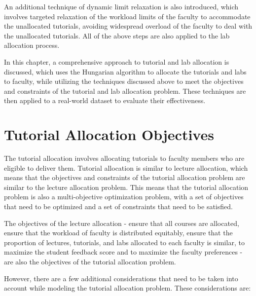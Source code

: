 An additional technique of dynamic limit relaxation is also introduced, which involves targeted relaxation of the workload limits of the faculty to accommodate the unallocated tutorials, avoiding widespread overload of the faculty to deal with the unallocated tutorials. All of the above steps are also applied to the lab allocation process.

In this chapter, a comprehensive approach to tutorial and lab allocation is discussed, which uses the Hungarian algorithm to allocate the tutorials and labs to faculty, while utilizing the techniques discussed above to meet the objectives and constraints of the tutorial and lab allocation problem. These techniques are then applied to a real-world dataset to evaluate their effectiveness.

\section{Tutorial Allocation Objectives}

The tutorial allocation involves allocating tutorials to faculty members who are eligible to deliver them. Tutorial allocation is similar to lecture allocation, which means that the objectives and constraints of the tutorial allocation problem are similar to the lecture allocation problem. This means that the tutorial allocation problem is also a multi-objective optimization problem, with a set of objectives that need to be optimized and a set of constraints that need to be satisfied.

The objectives of the lecture allocation - ensure that all courses are allocated, ensure that the workload of faculty is distributed equitably, ensure that the proportion of lectures, tutorials, and labs allocated to each faculty is similar, to maximize the student feedback score and to maximize the faculty preferences - are also the objectives of the tutorial allocation problem.

However, there are a few additional considerations that need to be taken into account while modeling the tutorial allocation problem. These considerations are:

